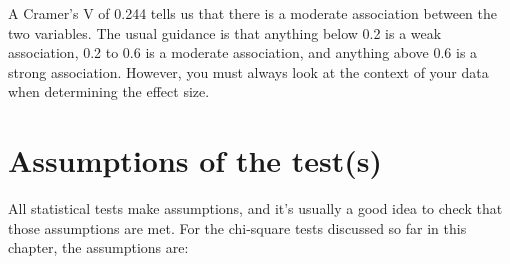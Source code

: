 \documentclass[
  11pt,
  a4paper,
  twoside,symmetric,openright]{book}
\theoremstyle{break}
\theoremstyle{break}
\begin{document}
A Cramer's V of 0.244 tells us that there is a moderate association between the two variables. The usual guidance is that anything below 0.2 is a weak association, 0.2 to 0.6 is a moderate association, and anything above 0.6 is a strong association. However, you must always look at the context of your data when determining the effect size.

\section{Assumptions of the test(s)}\label{chisqassumptions}

All statistical tests make assumptions, and it's usually a good idea to check that those assumptions are met. For the chi-square tests discussed so far in this chapter, the assumptions are:
\end{document}
